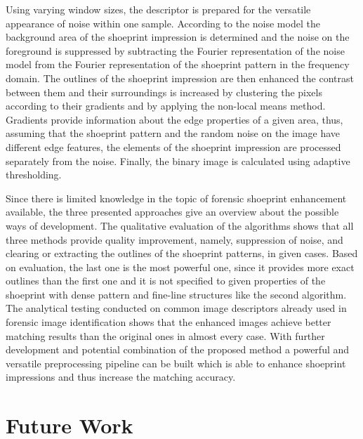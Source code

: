 \documentclass[draft,final]{vutinfth} %
\begin{document}
Using varying window sizes, the descriptor is prepared for the versatile appearance of noise within one sample.
According to the noise model the background area of the shoeprint impression is determined and the noise on the foreground is suppressed by subtracting the Fourier representation of the noise model from the Fourier representation of the shoeprint pattern in the frequency domain.
The outlines of the shoeprint impression are then enhanced the contrast between them and their surroundings is increased by clustering the pixels according to their gradients  and by applying the non-local means method.
Gradients provide information about the edge properties of a given area, thus, assuming that the shoeprint pattern and the random noise on the image have different edge features, the elements of the shoeprint impression are processed separately from the noise.
Finally, the binary image is calculated using adaptive thresholding.
\par
Since there is limited knowledge in the topic of forensic shoeprint enhancement available, the three presented approaches give an overview about the possible ways of development.
The qualitative evaluation of the algorithms shows that all three methods provide quality improvement, namely, suppression of noise, and clearing or extracting the outlines of the shoeprint patterns, in given cases. 
Based on evaluation, the last one is the most powerful one, since it provides more exact outlines than the first one and it is not specified to given properties of the shoeprint with dense pattern and fine-line structures like the second algorithm.
The analytical testing conducted on common image descriptors already used in forensic image identification shows that the enhanced images achieve better matching results than the original ones in almost every case.
With further development and potential combination of the proposed method a powerful and versatile preprocessing pipeline can be built which is able to enhance shoeprint impressions and thus increase the matching accuracy.

\section*{Future Work}
\end{document}
